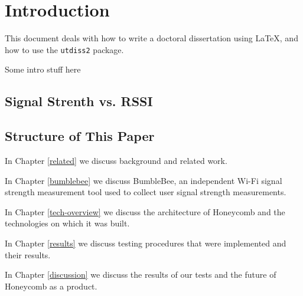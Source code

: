 \chapter{Introduction}
\label{introduction}
%


This document deals with how to write a doctoral dissertation 
using \LaTeX{}, and how to use the \texttt{utdiss2} package. 
%

Some intro stuff here \cite{poorten:sp}

\section{Signal Strenth vs. RSSI}
%

\section{Structure of This Paper}
%

In Chapter \ref{related} we discuss background and related work.

In Chapter \ref{bumblebee} we discuss BumbleBee, an independent Wi-Fi signal strength measurement tool used to collect user signal strength measurements.

In Chapter \ref{tech-overview} we discuss the architecture of Honeycomb and the technologies on which it was built.

In Chapter \ref{results} we discuss testing procedures that were implemented and their results.

In Chapter \ref{discussion} we discuss the results of our tests and the future of Honeycomb as a product.